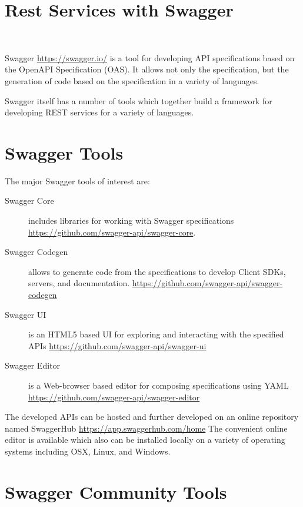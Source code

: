 

\section{Rest Services with Swagger}

\FILENAME\

Swagger \url{https://swagger.io/} is a tool for developing API
specifications based on the OpenAPI Specification (OAS). It allows not
only the specification, but the generation of code based on the
specification in a variety of languages.

Swagger itself has a number of tools which together build a framework
for developing REST services for a variety of languages.


\section{Swagger Tools}

The major Swagger tools of interest are:

\begin{description}

\item[Swagger Core] includes libraries for working with Swagger
 specifications \url{https://github.com/swagger-api/swagger-core}.

\item[Swagger Codegen] allows to generate code from the specifications
 to develop Client SDKs, servers, and documentation. \url{https://github.com/swagger-api/swagger-codegen}

\item[Swagger UI] is an HTML5 based UI for exploring and interacting
 with the specified APIs \url{https://github.com/swagger-api/swagger-ui}

\item[Swagger Editor] is a Web-browser based editor for composing 
 specifications using YAML \url{https://github.com/swagger-api/swagger-editor}

\end{description}

The developed APIs can be hosted and further developed on an
online repository named SwaggerHub \url{https://app.swaggerhub.com/home}
The convenient online editor is available which also can be installed
locally on a variety of operating systems including OSX, Linux, and
Windows. 

\section{Swagger Community Tools}

